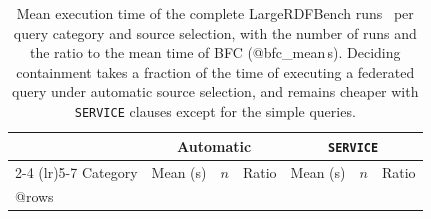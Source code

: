 \begin{table}[!t]
  \centering
  \small
  \caption{Mean execution time of the complete LargeRDFBench runs~\cite{saleem2018largerdfbench} per query category and source selection, with the number of runs and the ratio to the mean time of \acs{BFC} (@bfc_mean\,s).
Deciding containment takes a fraction of the time of executing a federated query under automatic source selection, and remains cheaper with \texttt{SERVICE} clauses except for the simple queries.}
  \label{fig:largerdfbench_bfc}
  \begin{tabular}{lrrrrrr}
    \toprule
    & \multicolumn{3}{c}{Automatic} & \multicolumn{3}{c}{\texttt{SERVICE}} \\
    \cmidrule(lr){2-4} \cmidrule(lr){5-7}
    Category & Mean (s) & $n$ & Ratio & Mean (s) & $n$ & Ratio \\
    \midrule
@rows
    \bottomrule
  \end{tabular}
\end{table}
